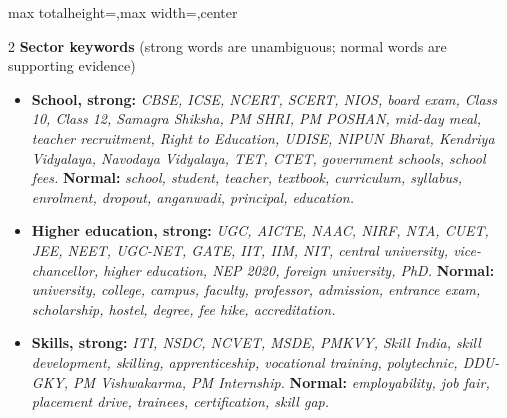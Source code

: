 \documentclass[8pt,a4paper]{extarticle}
\newcommand{\kw}[1]{\textit{#1}}
\newcommand{\lbl}[1]{\textbf{#1}}
\begin{document}
\begin{adjustbox}{max totalheight=\textheight,max width=\textwidth,center}
\begin{minipage}{\textwidth}
\begin{multicols}{2}
\vspace{2pt}
\lbl{Sector keywords} (strong words are unambiguous; normal words are supporting evidence)
\begin{itemize}
  \item \lbl{School, strong:} \kw{CBSE, ICSE, NCERT, SCERT, NIOS, board exam, Class 10, Class 12, Samagra Shiksha,
        PM SHRI, PM POSHAN, mid-day meal, teacher recruitment, Right to Education, UDISE, NIPUN Bharat, Kendriya
        Vidyalaya, Navodaya Vidyalaya, TET, CTET, government schools, school fees.}
        \lbl{Normal:} \kw{school, student, teacher, textbook, curriculum, syllabus, enrolment, dropout, anganwadi,
        principal, education.}
  \item \lbl{Higher education, strong:} \kw{UGC, AICTE, NAAC, NIRF, NTA, CUET, JEE, NEET, UGC-NET, GATE, IIT, IIM,
        NIT, central university, vice-chancellor, higher education, NEP 2020, foreign university, PhD.}
        \lbl{Normal:} \kw{university, college, campus, faculty, professor, admission, entrance exam, scholarship,
        hostel, degree, fee hike, accreditation.}
  \item \lbl{Skills, strong:} \kw{ITI, NSDC, NCVET, MSDE, PMKVY, Skill India, skill development, skilling,
        apprenticeship, vocational training, polytechnic, DDU-GKY, PM Vishwakarma, PM Internship.}
        \lbl{Normal:} \kw{employability, job fair, placement drive, trainees, certification, skill gap.}
\end{itemize}


\end{multicols}
\end{minipage}
\end{adjustbox}
\end{document}
